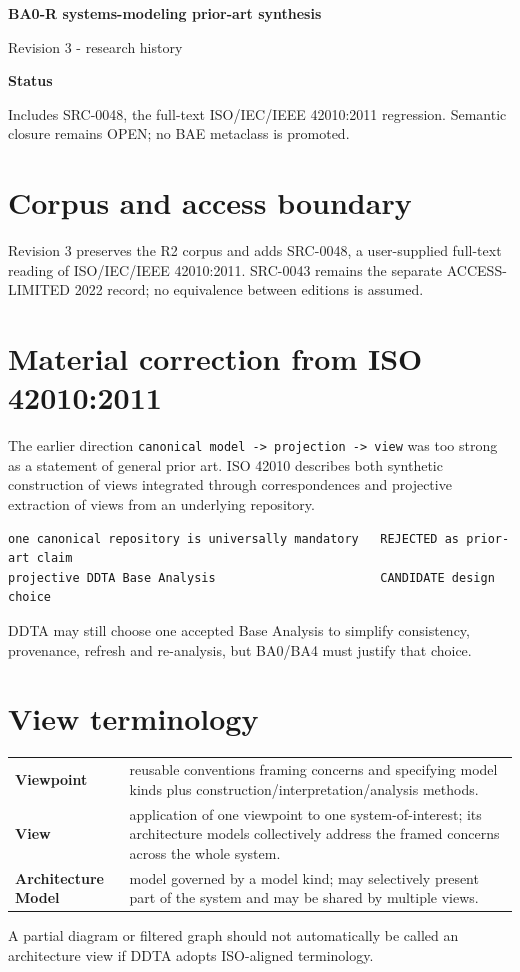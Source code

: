 \documentclass[10pt,a4paper]{article}
\newenvironment{challenge}[1]{\def\FrameCommand{\fcolorbox{ddtaorange}{ddtagray}}\MakeFramed{\advance\hsize-2\width\FrameRestore}\noindent\textbf{#1}\par\smallskip}{\endMakeFramed}
\begin{document}
\begin{center}{\LARGE\bfseries BA0-R systems-modeling prior-art synthesis}\par{\large Revision 3 - research history}\par{}\end{center}
\begin{challenge}{Status}Includes SRC-0048, the full-text ISO/IEC/IEEE 42010:2011 regression. Semantic closure remains OPEN; no BAE metaclass is promoted.\end{challenge}
\section{Corpus and access boundary}
Revision 3 preserves the R2 corpus and adds SRC-0048, a user-supplied full-text reading of ISO/IEC/IEEE 42010:2011. SRC-0043 remains the separate ACCESS-LIMITED 2022 record; no equivalence between editions is assumed.
\section{Material correction from ISO 42010:2011}
The earlier direction \texttt{canonical model -> projection -> view} was too strong as a statement of general prior art. ISO 42010 describes both synthetic construction of views integrated through correspondences and projective extraction of views from an underlying repository.
\begin{lstlisting}
one canonical repository is universally mandatory   REJECTED as prior-art claim
projective DDTA Base Analysis                       CANDIDATE design choice
\end{lstlisting}
DDTA may still choose one accepted Base Analysis to simplify consistency, provenance, refresh and re-analysis, but BA0/BA4 must justify that choice.
\section{View terminology}
\begin{tabularx}{\linewidth}{>{\bfseries}p{3.5cm}X}
Viewpoint & reusable conventions framing concerns and specifying model kinds plus construction/interpretation/analysis methods.\\
View & application of one viewpoint to one system-of-interest; its architecture models collectively address the framed concerns across the whole system.\\
Architecture Model & model governed by a model kind; may selectively present part of the system and may be shared by multiple views.\\
\end{tabularx}
A partial diagram or filtered graph should not automatically be called an architecture view if DDTA adopts ISO-aligned terminology.
\end{document}
